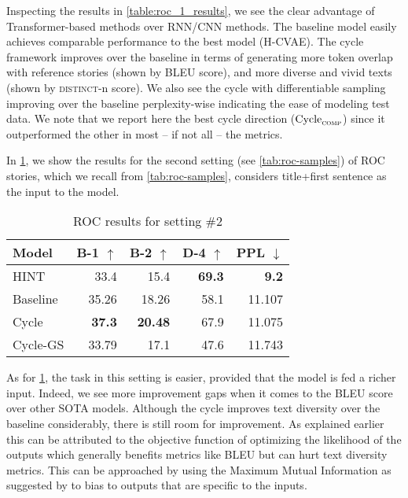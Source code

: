 Inspecting the results in \cref{table:roc_1_results}, we see the clear advantage of Transformer-based methods over RNN/CNN methods. The baseline model easily achieves comparable performance to the best model (H-CVAE). The cycle framework improves over the baseline in terms of generating more token overlap with reference stories (shown by BLEU score), and more diverse and vivid texts (shown by \textsc{distinct}-n score). We also see the cycle with differentiable sampling improving over the baseline perplexity-wise indicating the ease of modeling test data. We note that we report here the best cycle direction ($\text{Cycle}_{\textsc{comp}}$) since it outperformed the other in most -- if not all -- the metrics.

In \cref{table:roc_2_results}, we show the results for the second setting (see \cref{tab:roc-samples}) of ROC stories, which we recall from \cref{tab:roc-samples}, considers title+first sentence as the input to the model.

\begin{table}[ht]
\centering
\begin{tabular}{l|rr|r|r}
Model & B-1 $\uparrow$ & B-2 $\uparrow$ & D-4 $\uparrow$ & PPL $\downarrow$  \\ \hline
HINT & 33.4 & 15.4 & \textbf{69.3} & \textbf{9.2} \\ \hline
Baseline & 35.26 & 18.26 & 58.1 & 11.107 \\
Cycle & \textbf{37.3} & \textbf{20.48} & 67.9 & 11.075 \\
Cycle-GS & 33.79 & 17.1 & 47.6 & 11.743
\end{tabular}
\caption{ROC results for setting \#2}
\label{table:roc_2_results}
\end{table}

As for \cref{table:roc_2_results}, the task in this setting is easier, provided that the model is fed a richer input. Indeed, we see more improvement gaps when it comes to the BLEU score over other SOTA models. Although the cycle improves text diversity over the baseline considerably, there is still room for improvement. As explained earlier this can be attributed to the objective function of optimizing the likelihood of the outputs which generally benefits metrics like BLEU but can hurt text diversity metrics. This can be approached by using the Maximum Mutual Information as suggested by \citep{li2015diversity} to bias to outputs that are specific to the inputs.

